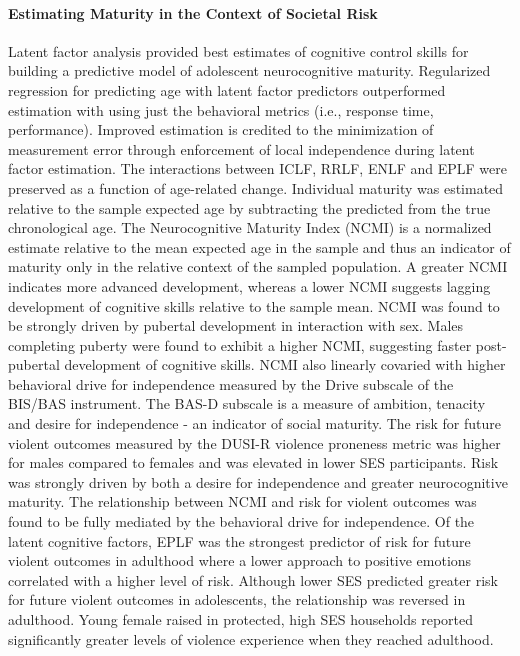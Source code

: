 \documentclass[utf8]{frontiersSCNS} %
\begin{document}
\paragraph*{Estimating Maturity in the Context of Societal Risk}
Latent factor analysis provided best estimates of cognitive control skills for building a predictive model of adolescent neurocognitive maturity. Regularized regression for predicting age with latent factor predictors outperformed estimation with using just the behavioral metrics (i.e., response time, performance). Improved estimation is credited to the minimization of measurement error through enforcement of local independence during latent factor estimation. The interactions between ICLF, RRLF, ENLF and EPLF were preserved as a function of age-related change. Individual maturity was estimated relative to the sample expected age by subtracting the predicted from the true chronological age. The Neurocognitive Maturity Index (NCMI) is a normalized estimate relative to the mean expected age in the sample and thus an indicator of maturity only in the relative context of the sampled population. A greater NCMI indicates more advanced development, whereas a lower NCMI suggests lagging development of cognitive skills relative to the sample mean. NCMI was found to be strongly driven by pubertal development in interaction with sex. Males completing puberty were found to exhibit a higher NCMI, suggesting faster post-pubertal development of cognitive skills. NCMI also linearly covaried with higher behavioral drive for independence measured by the Drive subscale of the BIS/BAS instrument. The BAS-D subscale is a measure of ambition, tenacity and desire for independence - an indicator of social maturity. The risk for future violent outcomes measured by the DUSI-R violence proneness metric was higher for males compared to females and was elevated in lower SES participants. Risk was strongly driven by both a desire for independence and greater neurocognitive maturity. The relationship between NCMI and risk for violent outcomes was found to be fully mediated by the behavioral drive for independence. Of the latent cognitive factors, EPLF was the strongest predictor of risk for future violent outcomes in adulthood where a lower approach to positive emotions correlated with a higher level of risk. Although lower SES predicted greater risk for future violent outcomes in adolescents, the relationship was reversed in adulthood. Young female raised in protected, high SES households reported significantly greater levels of violence experience when they reached adulthood.
\end{document}
